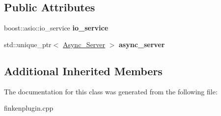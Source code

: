 \subsection*{Public Attributes}
\begin{DoxyCompactItemize}
\item 
boost\+::asio\+::io\+\_\+service {\bfseries io\+\_\+service}\hypertarget{classFinkenPlugin_a895a0de924a1c60e3cb65ff1cf139fdc}{}\label{classFinkenPlugin_a895a0de924a1c60e3cb65ff1cf139fdc}

\item 
std\+::unique\+\_\+ptr$<$ \hyperlink{classAsync__Server}{Async\+\_\+\+Server} $>$ {\bfseries async\+\_\+server}\hypertarget{classFinkenPlugin_aeb198541b548eb5b1ba09221aaa35a26}{}\label{classFinkenPlugin_aeb198541b548eb5b1ba09221aaa35a26}

\end{DoxyCompactItemize}
\subsection*{Additional Inherited Members}


The documentation for this class was generated from the following file\+:\begin{DoxyCompactItemize}
\item 
finkenplugin.\+cpp\end{DoxyCompactItemize}
